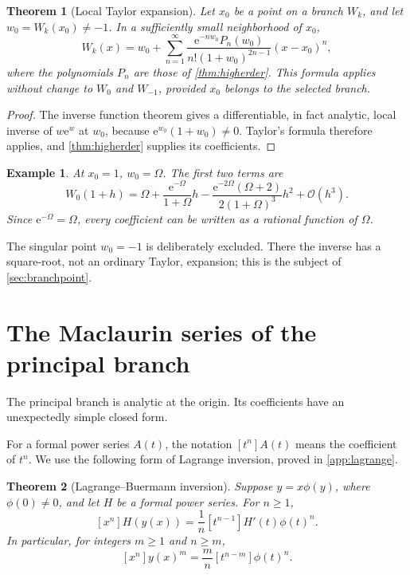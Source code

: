 \documentclass[11pt]{article}
\newtheorem{theorem}{Theorem}[section]
\newtheorem{example}[example]{Example}
\theoremstyle{remark}
\newcommand{\ee}{\mathrm e}
\newcommand{\bigO}{\mathcal O}
\begin{document}
\begin{theorem}[Local Taylor expansion]\label{thm:generalTaylor}
Let \(x_0\) be a point on a branch \(W_k\), and let
\(w_0=W_k(x_0)\neq-1\).  In a sufficiently small neighborhood of \(x_0\),
\begin{equation}\label{eq:generalTaylor}
 W_k(x)=w_0+
 \sum_{n=1}^{\infty}
 \frac{\ee^{-nw_0}P_n(w_0)}
      {n!(1+w_0)^{2n-1}}(x-x_0)^n,
\end{equation}
where the polynomials \(P_n\) are those of
\cref{thm:higherder}.  This formula applies without change to \(W_0\) and
\(W_{-1}\), provided \(x_0\) belongs to the selected branch.
\end{theorem}

\begin{proof}
The inverse function theorem gives a differentiable, in fact analytic, local
inverse of \(w\ee^w\) at \(w_0\), because
\(\ee^{w_0}(1+w_0)\neq0\).  Taylor's formula therefore applies, and
\cref{thm:higherder} supplies its coefficients.
\end{proof}

\begin{example}
At \(x_0=1\), \(w_0=\Omega\).  The first two terms are
\[
 W_0(1+h)=\Omega+
 \frac{\ee^{-\Omega}}{1+\Omega}h
 -\frac{\ee^{-2\Omega}(\Omega+2)}
        {2(1+\Omega)^3}h^2+\bigO(h^3).
\]
Since \(\ee^{-\Omega}=\Omega\), every coefficient can be written as a
rational function of \(\Omega\).
\end{example}

The singular point \(w_0=-1\) is deliberately excluded.  There the inverse
has a square-root, not an ordinary Taylor, expansion; this is the subject of
\cref{sec:branchpoint}.

\section{The Maclaurin series of the principal branch}\label{sec:maclaurin}

The principal branch is analytic at the origin.  Its coefficients have an
unexpectedly simple closed form.

For a formal power series \(A(t)\), the notation \([t^n]A(t)\) means the
coefficient of \(t^n\).  We use the following form of Lagrange inversion,
proved in \cref{app:lagrange}.

\begin{theorem}[Lagrange--Buer\-mann inversion]\label{thm:lagrange}
Suppose \(y=x\phi(y)\), where \(\phi(0)\neq0\), and let \(H\) be a formal
power series.  For \(n\geq1\),
\begin{equation}\label{eq:lagrange}
 [x^n]H(y(x))
 =\frac1n[t^{n-1}]H'(t)\phi(t)^n.
\end{equation}
In particular, for integers \(m\geq1\) and \(n\geq m\),
\begin{equation}\label{eq:lagrange-power}
 [x^n]y(x)^m
 =\frac{m}{n}[t^{n-m}]\phi(t)^n.
\end{equation}
\end{theorem}
\end{document}
